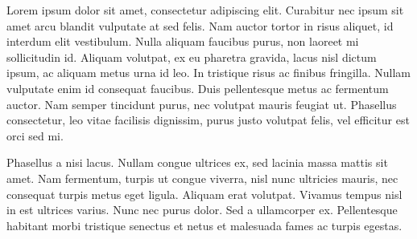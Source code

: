 \documentclass[
  letterpaper,
  DIV=11,
  numbers=noendperiod]{scrreprt}
\begin{document}
Lorem ipsum dolor sit amet, consectetur adipiscing elit. Curabitur nec
ipsum sit amet arcu blandit vulputate at sed felis. Nam auctor tortor in
risus aliquet, id interdum elit vestibulum. Nulla aliquam faucibus
purus, non laoreet mi sollicitudin id. Aliquam volutpat, ex eu pharetra
gravida, lacus nisl dictum ipsum, ac aliquam metus urna id leo. In
tristique risus ac finibus fringilla. Nullam vulputate enim id consequat
faucibus. Duis pellentesque metus ac fermentum auctor. Nam semper
tincidunt purus, nec volutpat mauris feugiat ut. Phasellus consectetur,
leo vitae facilisis dignissim, purus justo volutpat felis, vel efficitur
est orci sed mi.

Phasellus a nisi lacus. Nullam congue ultrices ex, sed lacinia massa
mattis sit amet. Nam fermentum, turpis ut congue viverra, nisl nunc
ultricies mauris, nec consequat turpis metus eget ligula. Aliquam erat
volutpat. Vivamus tempus nisl in est ultrices varius. Nunc nec purus
dolor. Sed a ullamcorper ex. Pellentesque habitant morbi tristique
senectus et netus et malesuada fames ac turpis egestas.

\newpage

\end{document}
